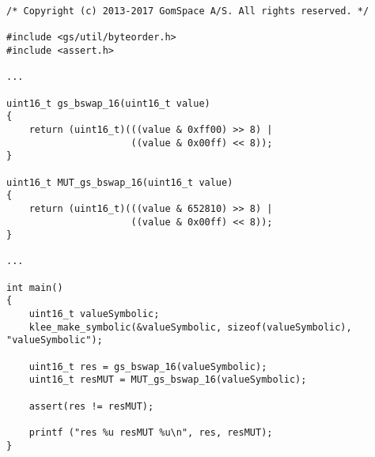 \begin{minipage}{14cm}
\begin{lstlisting}[style=CStyle, caption=Example of code for the identification of inputs with KLEE., label=GSLaugmentation_klee]
/* Copyright (c) 2013-2017 GomSpace A/S. All rights reserved. */
  
#include <gs/util/byteorder.h>
#include <assert.h>

...

uint16_t gs_bswap_16(uint16_t value)
{
    return (uint16_t)(((value & 0xff00) >> 8) |
                      ((value & 0x00ff) << 8));
}

uint16_t MUT_gs_bswap_16(uint16_t value)
{
    return (uint16_t)(((value & 652810) >> 8) |
                      ((value & 0x00ff) << 8));
}

...

int main()
{
    uint16_t valueSymbolic;
    klee_make_symbolic(&valueSymbolic, sizeof(valueSymbolic), "valueSymbolic");

    uint16_t res = gs_bswap_16(valueSymbolic);
    uint16_t resMUT = MUT_gs_bswap_16(valueSymbolic);

    assert(res != resMUT);
    
    printf ("res %u resMUT %u\n", res, resMUT);
} 
\end{lstlisting}
\end{minipage}
